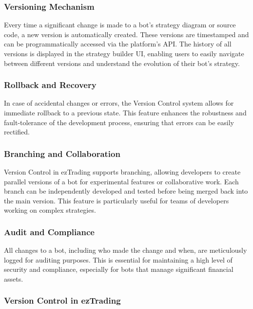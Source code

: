 \subsubsection{Versioning Mechanism}
\label{subsec:versioning}

Every time a significant change is made to a bot's strategy diagram or source code, a new version is automatically created. These versions are timestamped and can be programmatically accessed via the platform's API. The history of all versions is displayed in the strategy builder UI, enabling users to easily navigate between different versions and understand the evolution of their bot's strategy.

\subsubsection{Rollback and Recovery}
\label{subsec:rollback}

In case of accidental changes or errors, the Version Control system allows for immediate rollback to a previous state. This feature enhances the robustness and fault-tolerance of the development process, ensuring that errors can be easily rectified.

\subsubsection{Branching and Collaboration}
\label{subsec:branching}

Version Control in ezTrading supports branching, allowing developers to create parallel versions of a bot for experimental features or collaborative work. Each branch can be independently developed and tested before being merged back into the main version. This feature is particularly useful for teams of developers working on complex strategies.

\subsubsection{Audit and Compliance}
\label{subsec:audit}

All changes to a bot, including who made the change and when, are meticulously logged for auditing purposes. This is essential for maintaining a high level of security and compliance, especially for bots that manage significant financial assets.

\subsubsection{Version Control in ezTrading}
\label{sec:version-control-ez}

